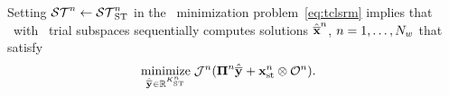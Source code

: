\begin{comment}
each window, we introduce the space--time trial subspace
$$ \stateArgnt{n} \in \stspaceSTArg{n} \subseteq \RR{N} \otimes \timeSpaceArg{n},$$
along with the space--time trial basis matrix \textit{function}, 
\begin{align*}
\stbasisArgnt{n} &: t \mapsto \stbasis(t) \\
 &: [\timeStartArg{n},\timeEndArg{n}] \rightarrow  \RR{N \times \stdimArg{n}}  ,%
\end{align*}
\KTC{shouldn't be $\equiv$. Look earlier for this. the right hand side should
be on the left with $\defeq$.} with $\Range{\stbasisArgnt{n}} + \stateInterceptSTArg{} \equiv \stspaceSTArg{n} $ and where $\stdimArg{n}$ is the number of space--time generalized coordinates over the $n$th window. 
For simplicity we assume the reference state to be equivalent for each time window, although no such requirement is necessary. 
\KTC{Remove all commas before equations unless it makes sense gramatically.
Add the $n$ superscript to $x_{ref}$}
The state over each window is approximated by,
\begin{equation}\label{eq:stapprox}
 \stateFOMArg{n}{t} \approx \approxstateArg{n}{t}  = \stbasisArg{n}{t} \stgenstateArg{n} + \stateInterceptSTArg{},
\end{equation}

\end{comment}
Setting $\mathcal{ ST }^n \leftarrow \mathcal{ ST }_{\text{ST}}^{n}$ in the
\methodAcronym\ minimization problem~\eqref{eq:tclsrm} implies that
\methodAcronym\ with \spaceTimeAcronym\ trial subspaces sequentially computes
solutions $\hat{\mathbf{\overline{x}}}^{n}$, $n = 1,\ldots,N_w$ that satisfy
\begin{align}\label{eq:obj_gen_slab_spacetime}
\begin{split}
&\underset{\stgenstateyArg{} \in \RR{\stdimArg{n}}}{\text{minimize}}\; \mathcal{J}^n( \stbasisArgnt{n} \stgenstateyArg{} + \stateInterceptSTArg{n} \otimes \onesFunctionArg{n} ).%
\end{split}
\end{align}
